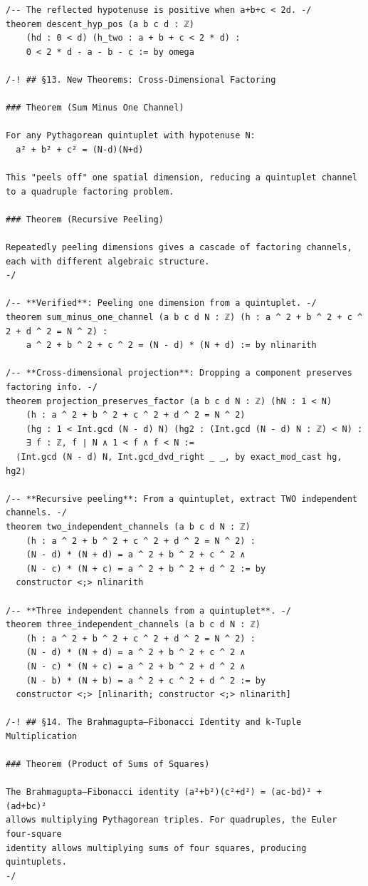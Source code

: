 \documentclass[11pt,openany]{book}
\theoremstyle{definition}
\theoremstyle{plain}
\theoremstyle{remark}
\begin{document}
\begin{lstlisting}[style=lean]
/-- The reflected hypotenuse is positive when a+b+c < 2d. -/
theorem descent_hyp_pos (a b c d : ℤ)
    (hd : 0 < d) (h_two : a + b + c < 2 * d) :
    0 < 2 * d - a - b - c := by omega

/-! ## §13. New Theorems: Cross-Dimensional Factoring

### Theorem (Sum Minus One Channel)

For any Pythagorean quintuplet with hypotenuse N:
  a² + b² + c² = (N-d)(N+d)

This "peels off" one spatial dimension, reducing a quintuplet channel
to a quadruple factoring problem.

### Theorem (Recursive Peeling)

Repeatedly peeling dimensions gives a cascade of factoring channels,
each with different algebraic structure.
-/

/-- **Verified**: Peeling one dimension from a quintuplet. -/
theorem sum_minus_one_channel (a b c d N : ℤ) (h : a ^ 2 + b ^ 2 + c ^ 2 + d ^ 2 = N ^ 2) :
    a ^ 2 + b ^ 2 + c ^ 2 = (N - d) * (N + d) := by nlinarith

/-- **Cross-dimensional projection**: Dropping a component preserves factoring info. -/
theorem projection_preserves_factor (a b c d N : ℤ) (hN : 1 < N)
    (h : a ^ 2 + b ^ 2 + c ^ 2 + d ^ 2 = N ^ 2)
    (hg : 1 < Int.gcd (N - d) N) (hg2 : (Int.gcd (N - d) N : ℤ) < N) :
    ∃ f : ℤ, f ∣ N ∧ 1 < f ∧ f < N :=
  ⟨Int.gcd (N - d) N, Int.gcd_dvd_right _ _, by exact_mod_cast hg, hg2⟩

/-- **Recursive peeling**: From a quintuplet, extract TWO independent channels. -/
theorem two_independent_channels (a b c d N : ℤ)
    (h : a ^ 2 + b ^ 2 + c ^ 2 + d ^ 2 = N ^ 2) :
    (N - d) * (N + d) = a ^ 2 + b ^ 2 + c ^ 2 ∧
    (N - c) * (N + c) = a ^ 2 + b ^ 2 + d ^ 2 := by
  constructor <;> nlinarith

/-- **Three independent channels from a quintuplet**. -/
theorem three_independent_channels (a b c d N : ℤ)
    (h : a ^ 2 + b ^ 2 + c ^ 2 + d ^ 2 = N ^ 2) :
    (N - d) * (N + d) = a ^ 2 + b ^ 2 + c ^ 2 ∧
    (N - c) * (N + c) = a ^ 2 + b ^ 2 + d ^ 2 ∧
    (N - b) * (N + b) = a ^ 2 + c ^ 2 + d ^ 2 := by
  constructor <;> [nlinarith; constructor <;> nlinarith]

/-! ## §14. The Brahmagupta–Fibonacci Identity and k-Tuple Multiplication

### Theorem (Product of Sums of Squares)

The Brahmagupta–Fibonacci identity (a²+b²)(c²+d²) = (ac-bd)² + (ad+bc)²
allows multiplying Pythagorean triples. For quadruples, the Euler four-square
identity allows multiplying sums of four squares, producing quintuplets.
-/


\end{lstlisting}
\end{document}
